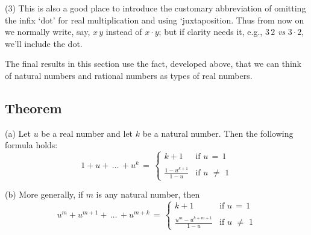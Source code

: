\V

        (3) This is also a good place to introduce the customary abbreviation of omitting the infix `dot' for real multiplication and using `juxtaposition.
    Thus from now on we normally write, say, $x\,y$ instead of $x{\cdot}y$; but if clarity needs it, e.g., $3\,2$ {\em vs} $3{\cdot}2$, we'll include the dot.


\VV





\V
\V

        The final results in this section use the fact, developed above, that we can think of natural numbers and rational numbers as types of real numbers.


\V

        \subsection{\small{{\bf Theorem}}}
        \label{ThmB25.80}

\V

        

\V

        (a) Let $u$ be a real number and let $k$ be a natural number. Then the following formula holds:
        \begin{displaymath}
        1+u + \,{\ldots}\,+u^{k} \,=\, \left\{
        \begin{array}{cl}
        k+1 & \mbox{if $u \,=\, 1$} \\
                       &            \\
        {\displaystyle \frac{1-u^{k+1}}{1-u}} & \mbox{if $u \,\,{\neq}\,\, 1$}
        \end{array}
            \right.
        \end{displaymath}

\V

        (b) More generally, if $m$ is any natural number, then
        \begin{displaymath}
        u^{m} + u^{m+1} + \,{\ldots}\, + u^{m+k} \,=\, \left\{
        \begin{array}{cl}
        k+1 & \mbox{if $u \,=\, 1$} \\
                       &            \\
        {\displaystyle \frac{u^{m}-u^{k+m+1}}{1-u}} & \mbox{if $u \,\,{\neq}\,\, 1$}
        \end{array}
            \right.
        \end{displaymath}

